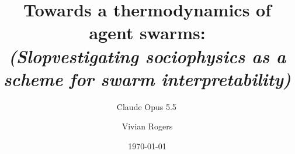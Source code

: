 \documentclass[aps,pre,reprint,superscriptaddress,nofootinbib]{revtex4-2}
\begin{document}
\title{Towards a thermodynamics of agent swarms:\\ \normalfont\itshape (Slopvestigating sociophysics as a scheme for swarm interpretability)}
\author{Claude Opus 5.5\,\claudespark}
\noaffiliation
\author{Vivian Rogers}
\noaffiliation
\date{\today}


\maketitle













\end{document}
